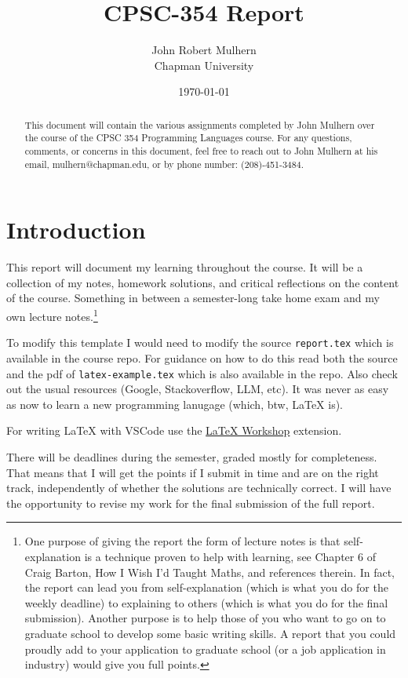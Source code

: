 \documentclass{article}
\title{CPSC-354 Report}
\author{John Robert Mulhern  \\ Chapman University}
\date{\today}
\theoremstyle{theorem}
\theoremstyle{definition}
\theoremstyle{remark}
\begin{document}
\maketitle

\begin{abstract}
This document will contain the various assignments completed by John Mulhern over the course of the CPSC 354 Programming Languages course. For any questions, comments, or concerns in this document, feel free to reach out to John Mulhern at his email, mulhern@chapman.edu, or by phone number: (208)-451-3484.   
\end{abstract}

\setcounter{tocdepth}{3}
\tableofcontents

\section{Introduction}\label{intro}

This report will document my learning throughout the course. It will be a collection of my notes, homework solutions, and critical reflections on the content of the course. Something in between a semester-long take home exam and my own lecture notes.\footnote{One purpose of giving the report the form of lecture notes is that self-explanation is a technique proven to help with learning, see Chapter 6 of Craig Barton, How I Wish I'd Taught Maths, and references therein. In fact, the report can lead you from self-explanation (which is what you do for the weekly deadline) to explaining to others (which is what you do for the final submission). Another purpose is to help those of you who want to go on to graduate school to develop some basic writing skills. A report that you could proudly add to your application to graduate school (or a job application in industry) would give you full points.}

To modify this template I would need to modify the source \texttt{report.tex} which is available in the course repo. For guidance on how to do this read both the source and the pdf of \texttt{latex-example.tex} which is also available in the repo. Also check out the usual resources (Google, Stackoverflow, LLM, etc). It was never as easy as now to learn a new programming lanugage (which, btw, \LaTeX{} is).

For writing \LaTeX{} with VSCode use the \href{https://marketplace.visualstudio.com/items?itemName=James-Yu.latex-workshop}{LaTeX Workshop} extension. 

There will be deadlines during the semester, graded mostly for completeness. That means that I will get the points if I submit in time and are on the right track, independently of whether the solutions are technically correct. I will have the opportunity to revise my work for the final submission of the full report.
\end{document}
